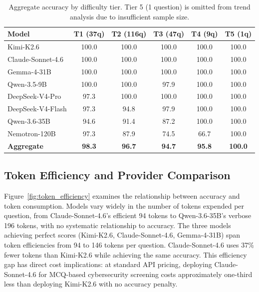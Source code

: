 \documentclass[final]{elsarticle}
\begin{document}
\begin{table}[t]
\centering
\caption{Aggregate accuracy by difficulty tier. Tier 5 (1 question) is omitted from trend analysis due to insufficient sample size.}
\label{tab:difficulty_summary}
\footnotesize
\begin{tabular}{lccccc}
\toprule
\textbf{Model} & \textbf{T1 (37q)} & \textbf{T2 (116q)} & \textbf{T3 (47q)} & \textbf{T4 (9q)} & \textbf{T5 (1q)} \\
\midrule
Kimi-K2.6 & 100.0 & 100.0 & 100.0 & 100.0 & 100.0 \\
Claude-Sonnet-4.6 & 100.0 & 100.0 & 100.0 & 100.0 & 100.0 \\
Gemma-4-31B & 100.0 & 100.0 & 100.0 & 100.0 & 100.0 \\
Qwen-3.5-9B & 100.0 & 100.0 & 97.9 & 100.0 & 100.0 \\
DeepSeek-V4-Pro & 97.3 & 100.0 & 100.0 & 100.0 & 100.0 \\
DeepSeek-V4-Flash & 97.3 & 94.8 & 97.9 & 100.0 & 100.0 \\
Qwen-3.6-35B & 94.6 & 91.4 & 87.2 & 100.0 & 100.0 \\
Nemotron-120B & 97.3 & 87.9 & 74.5 & 66.7 & 100.0 \\
\midrule
\textbf{Aggregate} & \textbf{98.3} & \textbf{96.7} & \textbf{94.7} & \textbf{95.8} & \textbf{100.0} \\
\bottomrule
\end{tabular}
\end{table}

\subsection{Token Efficiency and Provider Comparison}

Figure~\ref{fig:token_efficiency} examines the relationship between accuracy and token consumption. Models vary widely in the number of tokens expended per question, from Claude-Sonnet-4.6's efficient 94 tokens to Qwen-3.6-35B's verbose 196 tokens, with no systematic relationship to accuracy. The three models achieving perfect scores (Kimi-K2.6, Claude-Sonnet-4.6, Gemma-4-31B) span token efficiencies from 94 to 146 tokens per question. Claude-Sonnet-4.6 uses 37\% fewer tokens than Kimi-K2.6 while achieving the same accuracy. This efficiency gap has direct cost implications: at standard API pricing, deploying Claude-Sonnet-4.6 for MCQ-based cybersecurity screening costs approximately one-third less than deploying Kimi-K2.6 with no accuracy penalty.
\end{document}
